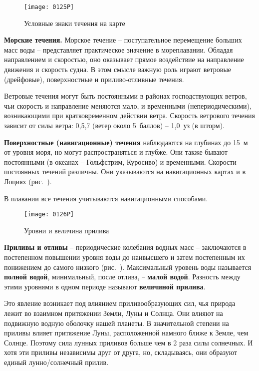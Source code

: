 \begin{figure}[htb]
  \centering{}
  \texttt{[image: 0125P]}
  \caption{Условные знаки течения на карте}
  \label{fig:125}
\end{figure}

\textbf{Морские течения.} Морское течение \---
поступательное перемещение больших масс воды \--- представляет
практическое значение в мореплавании. Обладая направлением и
скоростью, оно оказывает прямое воздействие на направление движения и
скорость судна. В этом смысле важную роль играют ветровые (дрейфовые),
поверхностные и приливо-отливные течения.

Ветровые течения могут быть постоянными в районах господствующих
ветров, чьи скорость и направление меняются мало, и временными
(непериодическими), возникающими при кратковременном действии
ветра. Скорость ветрового течения зависит от силы ветра: 0,5,7
(ветер около 5~баллов) \--- 1,0~уз (в шторм).

\textbf{Поверхностные (навигационные) течения} наблюдаются на глубинах
до 15~м от уровня моря, но могут распространяться и глубже. Они также
бывают постоянными (в океанах \--- Гольфстрим,
Куросиво) и
временными. Скорости постоянных течений различны. Они указываются на
навигационных картах и в Лоциях (рис.~).

В плавании все течения учитываются навигационными способами.

\begin{figure}[htb]
  \centering{}
  \texttt{[image: 0126P]}
  \caption{Уровни и величина прилива}
  \label{fig:126}
\end{figure}

\textbf{Приливы и отливы} \---
периодические колебания водных масс \--- заключаются в постепенном
повышении уровня воды до наивысшего и затем постепенным их понижением
до самого низкого (рис.~). Максимальный уровень воды
называется \textbf{полной водой},
минимальный, после отлива, \--- \textbf{малой водой}.
Разность между этими уровнями в одном периоде называют
\textbf{величиной прилива}.

Это явление возникает под влиянием приливообразующих сил, чья природа
лежит во взаимном притяжении Земли, Луны и Солнца. Они влияют на
подвижную водную оболочку нашей планеты. В значительной степени на
приливы влияет притяжение Луны, расположенной намного ближе к Земле,
чем Солнце. Поэтому сила лунных приливов больше чем в 2 раза силы
солнечных. И хотя эти приливы независимы друг от друга, но,
складываясь, они образуют единый лунно\-/солнечный прилив.

